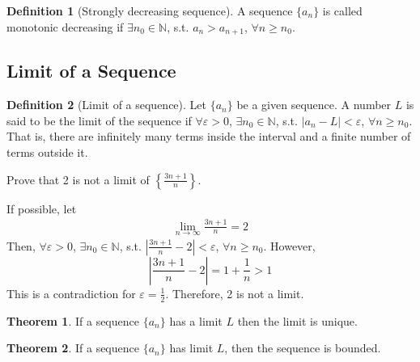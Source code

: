 \documentclass[fleqn, a4paper, 8pt, twoside]{amsart}
\theoremstyle{definition}
\theoremstyle{bluedefinition}
\newtheorem{definition}{Definition}
\theoremstyle{redtheorem}
\newtheorem{theorem}{Theorem}
\begin{document}
\begin{multicols}{2}
\begin{spacing}{0.7}
\begin{definition}[Strongly decreasing sequence]
	A sequence $\{a_n\}$ is called monotonic decreasing if $\exists n_0 \in \mathbb{N}$, s.t. $a_n > a_{n + 1}$, $\forall n \geq n_0$.
\end{definition}

\subsection{Limit of a Sequence}

\begin{definition}[Limit of a sequence]
	Let $\{a_n\}$ be a given sequence.
	A number $L$ is said to be the limit of the sequence if $\forall \varepsilon > 0$, $\exists n_0 \in \mathbb{N}$, s.t. $|a_n - L| < \varepsilon$, $\forall n \geq n_0$.
	That is, there are infinitely many terms inside the interval and a finite number of terms outside it.
\end{definition}

\begin{question}
	Prove that 2 is not a limit of $\left\{ \frac{3n + 1}{n} \right\}$.
\end{question}

\begin{solution}
	If possible, let 
	\begin{align*}
		\lim\limits_{n \to \infty} \frac{3n + 1}{n} = 2
	\end{align*}
	Then, $\forall \varepsilon > 0$, $\exists n_0 \in \mathbb{N}$, s.t. $\left| \frac{3n + 1}{n} - 2 \right| < \varepsilon$, $\forall n \geq n_0$.
	However,
	\begin{equation*}
		\left| \frac{3n + 1}{n} - 2 \right| = 1 + \frac{1}{n} > 1
	\end{equation*}
	This is a contradiction for $\varepsilon = \frac{1}{2}$.
	Therefore, 2 is not a limit.
\end{solution}

\begin{theorem}
	If a sequence $\{a_n\}$ has a limit $L$ then the limit is unique.
	\label{uniquness of a limit}
\end{theorem}

\begin{theorem}
	If a sequence $\{a_n\}$ has limit $L$, then the sequence is bounded.
	\label{existence of limit implies boundedness}
\end{theorem}


\end{spacing}
\end{multicols}
\end{document}
